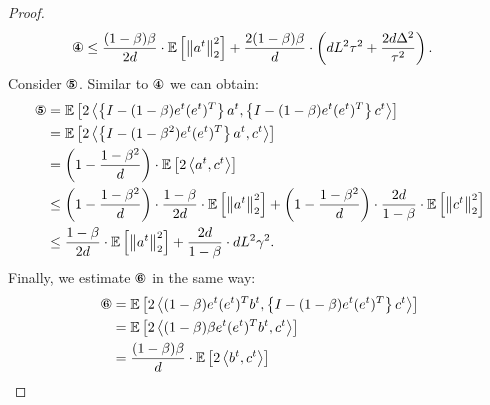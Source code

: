 \documentclass{article}
\theoremstyle{plain}
\theoremstyle{definition}
\theoremstyle{remark}
\newcommand{\expect}[1]{\mathbb{E}\left[ #1 \right]}
\newcommand{\norm}[1]{\left\| #1 \right\|}
\newcommand{\dotprod}[2]{\left\langle #1,#2 \right\rangle}
\newcommand{\circledFour}{\text{\ding{175}}}
\newcommand{\circledFive}{\text{\ding{176}}}
\newcommand{\circledSix}{\text{\ding{177}}}
\begin{document}
\begin{proof}
        \begin{align}
        \label{eq:jaguar_circ4}
            \circledFour 
            &\leq
            \frac{(1-\beta) \beta}{2d} \cdot \expect{\norm{a^t}_2^2}
            +
            \frac{2(1-\beta) \beta}{d} \cdot \left( 
                d L^2 \tau^2 
                + \frac{2 d \Delta^2}{\tau^2} 
            \right).
        \end{align}
        Consider $\circledFive$. Similar to $\circledFour$ we can obtain:
        \begin{align}
            \circledFive 
            &= 
            \expect{2\dotprod{
                \left\{I - (1-\beta)e^t (e^t)^T \right\} a^t
            }{
                \left\{I - (1-\beta)e^t (e^t)^T \right\} c^t
            }}
            \nonumber
            \\&=
            \expect{2\dotprod{
                \left\{I - (1-\beta^2)e^t (e^t)^T \right\} a^t
            }{
                c^t
            }}
            \nonumber
            \\&=
            \left(1 - \frac{1 - \beta^2}{d} \right) \cdot \expect{2\dotprod{
                a^t
            }{
                c^t
            }}
            \nonumber
            \\&\leq
            \left(1 - \frac{1 - \beta^2}{d} \right) \cdot \frac{1 - \beta}{2d} \cdot \expect{\norm{a^t}_2^2}
            +
            \left(1 - \frac{1 - \beta^2}{d} \right) \cdot \frac{2d}{1 - \beta} \cdot \expect{\norm{c^t}_2^2}
            \nonumber
            \\&\leq
            \frac{1 - \beta}{2d} \cdot \expect{\norm{a^t}_2^2}
            +
            \frac{2d}{1 - \beta} \cdot d L^2 \gamma^2 .
            \label{eq:jaguar_circ5}
        \end{align}
        Finally, we estimate $\circledSix$ in the same way:
        \begin{align}
            \circledSix 
            &=
            \expect{2\dotprod{
                (1 - \beta) e^t (e^t)^T b^t
            }{
                \left\{I - (1-\beta)e^t (e^t)^T \right\} c^t
            }}
            \nonumber
            \\&=
            \expect{2\dotprod{
                (1 - \beta) \beta e^t (e^t)^T b^t
            }{
                c^t
            }}
            \nonumber
            \\&=
            \frac{(1 - \beta) \beta}{d} \cdot \expect{2\dotprod{
                b^t
            }{
                c^t
}}
\end{align}
\end{proof}
\end{document}
